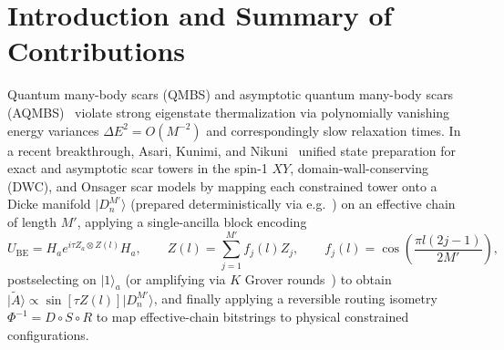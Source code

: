 \documentclass[11pt,a4paper]{article}
\theoremstyle{remark}
\newcommand{\ket}[1]{\lvert #1 \rangle}
\begin{document}
\section{Introduction and Summary of Contributions}
\label{sec:intro}

Quantum many-body scars (QMBS) and asymptotic quantum many-body scars (AQMBS)~\cite{GMM23,KKK25} violate strong eigenstate thermalization via polynomially vanishing energy variances $\Delta E^2 = O(M^{-2})$ and correspondingly slow relaxation times. In a recent breakthrough, Asari, Kunimi, and Nikuni~\cite{AKN26} unified state preparation for exact and asymptotic scar towers in the spin-1 $XY$, domain-wall-conserving (DWC), and Onsager scar models by mapping each constrained tower onto a Dicke manifold $\ket{D_n^{M'}}$ (prepared deterministically via e.g.~\cite{BE19}) on an effective chain of length $M'$, applying a single-ancilla block encoding
\begin{equation}
\label{eq:ube}
U_{\mathrm{BE}} = H_a e^{i \tau Z_a \otimes Z(l)} H_a,
\qquad
Z(l) = \sum_{j=1}^{M'} f_j(l) Z_j,
\qquad
f_j(l) = \cos\!\left(\frac{\pi l(2j - 1)}{2 M'}\right),
\end{equation}
postselecting on $\ket{1}_a$ (or amplifying via $K$ Grover rounds~\cite{BHMT02}) to obtain $\ket{\tilde{A}} \propto \sin[\tau Z(l)]\ket{D_n^{M'}}$, and finally applying a reversible routing isometry $\Phi^{-1} = D \circ S \circ R$ to map effective-chain bitstrings to physical constrained configurations.
\end{document}
